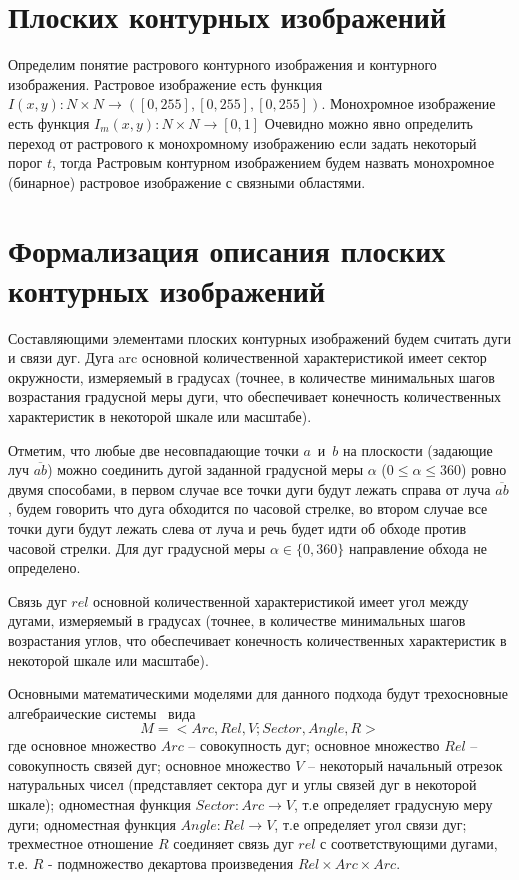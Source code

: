 \chapter{Плоских контурных изображений}
Определим понятие растрового контурного изображения и контурного изображения.
Растровое изображение есть функция $I(x,y): N \times N \to([0,255],[0,255],[0,255])$.
Монохромное изображение есть функция $I_m(x,y): N \times N \to [0,1]$
Очевидно можно явно определить переход от растрового к монохромному изображению если задать некоторый порог $t$, тогда
Растровым контурном изображением будем назвать монохромное (бинарное) растровое изображение с связными областями.

\chapter{Формализация описания плоских контурных изображений}
Составляющими элементами плоских контурных изображений будем считать дуги и связи дуг. Дуга arc основной количественной характеристикой имеет сектор окружности, измеряемый в градусах (точнее, в количестве минимальных шагов возрастания градусной меры дуги, что обеспечивает конечность количественных характеристик в некоторой шкале или масштабе).

Отметим, что любые две несовпадающие точки $a$~и~$b$ на плоскости (задающие луч $\overline{ab}$)
можно соединить дугой заданной градусной меры $\alpha$ ($0\le\alpha\le 360$) ровно двумя способами, в первом
случае все точки дуги будут лежать справа от луча $\overline{ab}$, будем говорить что дуга обходится по часовой стрелке, во втором случае все точки дуги будут лежать слева от луча и речь будет идти об обходе против часовой стрелки. Для дуг градусной меры $\alpha \in \{0,360\}$ направление обхода не определено.

Связь дуг $rel$ основной количественной характеристикой имеет угол между дугами, измеряемый в градусах (точнее, в количестве минимальных шагов возрастания углов, что обеспечивает конечность количественных характеристик в некоторой шкале или масштабе).

Основными математическими моделями для данного подхода будут трехосновные алгебраические системы~\cite{7}\cite{8} вида
\begin{equation}
M = < Arc, Rel, V; Sector, Angle, R >
\end{equation}
где основное множество $Arc$ – совокупность дуг; основное множество $Rel$ – совокупность связей дуг; основное множество $V$ – некоторый начальный отрезок натуральных чисел (представляет сектора дуг и углы связей дуг в некоторой шкале); одноместная функция $Sector: Arc \rightarrow V$, т.е определяет градусную меру дуги; одноместная функция $Angle: Rel \rightarrow V$, т.е определяет угол связи дуг; трехместное отношение $R$ соединяет связь дуг $rel$ с соответствующими дугами, т.е. $R$ - подмножество декартова произведения 
$Rel \times Arc \times Arc.$

